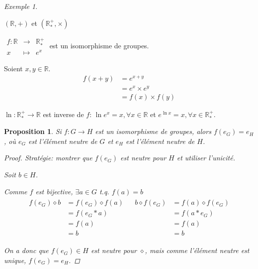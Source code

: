 \documentclass{report}
\newcommand*{\reels}{\mathbb{R}}
\newtheorem*{prop}{Proposition}
\theoremstyle{definition}
\theoremstyle{remark}
\newtheorem*{exem}{Exemple}
\begin{document}
	\begin{exem}~

		\begin{ulist}
			\item $(\reels,+)$ et $(\reels^+_*,\times)$

			$\begin{array}{rcl}
				f:\reels&\to&\reels^+_*\\
				x&\mapsto&e^x
			\end{array}$ est un isomorphisme de groupes.
			\begin{nlist}
				\item Soient $x,y \in \reels$.
				\begin{align*}
					f(x+y)&= e^{x+y}\\
					&= e^x \times e^y\\
					&= f(x) \times f(y)
				\end{align*}
				\item $\ln:\reels^+_* \to \reels$ est inverse de $f$: $\ln e^x=x, \forall x \in \reels$ et $e^{\ln x}=x, \forall x \in \reels^+_*$.
			\end{nlist}
		\end{ulist}
	\end{exem}
	\begin{prop}
		Si $f:G \to H$ est un isomorphisme de groupes, alors $f(e_G)=e_H$, o\`u $e_G$ est l'\'el\'ement neutre de $G$ et $e_H$ est l'\'el\'ement neutre de $H$.
		\begin{proof}
			Strat\'egie: montrer que $f(e_G)$ est neutre pour $H$ et utiliser l'unicit\'e.

			Soit $b \in H$.

			Comme $f$ est bijective, $\exists a \in G$ t.q. $f(a)=b$
			\begin{align*}
				\begin{split}
					f(e_G) \diamond b&= f(e_G) \diamond f(a)\\
					&= f(e_G*a)\\
					&= f(a)\\
					&=b
				\end{split}
				&
				\begin{split}
					b \diamond f(e_G)&= f(a) \diamond f(e_G)\\
					&= f(a*e_G)\\
					&= f(a)\\
					&= b
				\end{split}
			\end{align*}

			On a donc que $f(e_G) \in H$ est neutre pour $\diamond$, mais comme l'\'el\'ement neutre est unique, $f(e_G)=e_H$.
		\end{proof}
	\end{prop}
\end{document}
